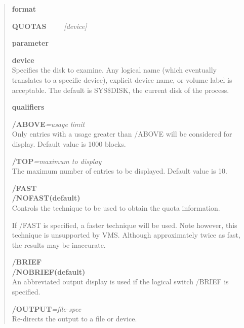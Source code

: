 \begin{quote}
\begin{description}

\item{\bf format}
\vspace{3mm}

{\bf QUOTAS}~~~~~{\em [device]}
\vspace{2mm}

\item{\bf parameter}
\vspace{3mm}

{\bf device}\\
Specifies the disk to examine.
Any logical name (which eventually translates to a specific device), explicit
device name, or volume label is acceptable.
The default is SYS\$DISK, the current disk of the process.
\vspace{3mm}

\item{\bf qualifiers}
\vspace{4mm}

{\bf /ABOVE}{\em =usage limit}\\
 Only entries with a usage greater than /ABOVE will be considered for display.
 Default value is 1000 blocks.
\vspace{4mm}

{\bf /TOP}{\em =maximum to display}\\
The maximum number of entries to be displayed.
Default value is 10.
\vspace{4mm}

{\bf /FAST}\\
{\bf /NOFAST(default)}\\
Controls the technique to be used to obtain the quota information.

If /FAST is specified, a faster technique will be used.
Note however, this technique is unsupported by VMS.
Although approximately twice as fast, the results may be inaccurate.
\vspace{2mm}

{\bf /BRIEF}\\
{\bf /NOBRIEF(default)}\\
An abbreviated output display is used if the logical switch /BRIEF is specified.
\vspace{4mm}

{\bf /OUTPUT}{\em =file-spec}\\
Re-directs the output to a file or device.
\end{description}
\end{quote}

